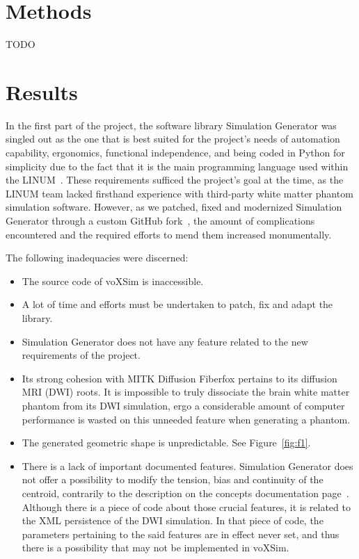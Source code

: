 \documentclass{article}
\begin{document}
  \section{Methods}\label{sec:methodology}

  TODO


  \section{Results}\label{sec:results}

  In the first part of the project, the software library Simulation Generator was singled out as the one that is best suited for the project's needs of automation capability, ergonomics, functional independence, and being coded in Python for simplicity due to the fact that it is the main programming language used within the LINUM~\cite{dubreuil2022inf6200}.
  These requirements sufficed the project's goal at the time, as the LINUM team lacked firsthand experience with third-party white matter phantom simulation software.
  However, as we patched, fixed and modernized Simulation Generator through a custom GitHub fork~\cite{dubreuil2022inm5803fiberconfiggen, valcourtcaron2022simulationgenerator}, the amount of complications encountered and the required efforts to mend them increased monumentally.

  The following inadequacies were discerned:
  \begin{itemize}
    \item The source code of voXSim is inaccessible.
    \item A lot of time and efforts must be undertaken to patch, fix and adapt the library.
    \item Simulation Generator does not have any feature related to the new requirements of the project.
    \item Its strong cohesion with MITK Diffusion Fiberfox pertains to its diffusion MRI (DWI) roots.
    It is impossible to truly dissociate the brain white matter phantom from its DWI simulation, ergo a considerable amount of computer performance is wasted on this unneeded feature when generating a phantom.
    \item The generated geometric shape is unpredictable.
    See Figure~\ref{fig:f1}.
    \item There is a lack of important documented features.
    Simulation Generator does not offer a possibility to modify the tension, bias and continuity of the centroid, contrarily to the description on the concepts documentation page~\cite{valcourtcaron2022simulationgenerator}.
    Although there is a piece of code about those crucial features, it is related to the XML persistence of the DWI simulation.
    In that piece of code, the parameters pertaining to the said features are in effect never set, and thus there is a possibility that may not be implemented in voXSim.
  \end{itemize}
\end{document}
